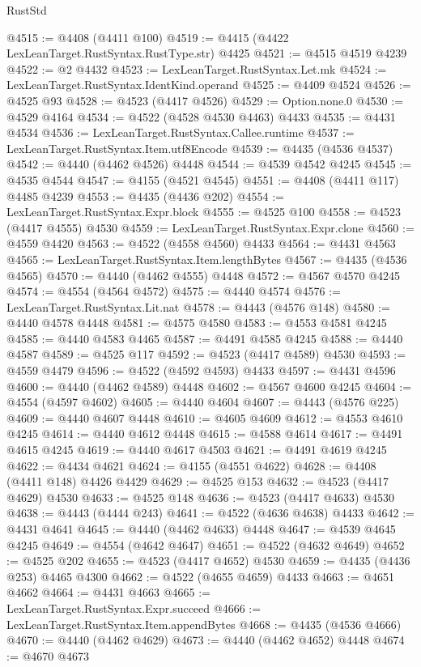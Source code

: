 \begin{lexlean}{RustStd}
\begin{coremodule}
{\begin{coremodule}
{{{{{{{{{{{{{{{{{{{{{{{{{{{{{{{{{{{{{{{{{{{{{{{{{{{{{{{{{{{{@4515 := @4408 (@4411 @100)
@4519 := @4415 (@4422 LexLeanTarget.RustSyntax.RustType.str) @4425
@4521 := @4515 @4519 @4239
@4522 := @2 @4432
@4523 := LexLeanTarget.RustSyntax.Let.mk
@4524 := LexLeanTarget.RustSyntax.IdentKind.operand
@4525 := @4409 @4524
@4526 := @4525 @93
@4528 := @4523 (@4417 @4526)
@4529 := Option.none.{0}
@4530 := @4529 @4164
@4534 := @4522 (@4528 @4530 @4463) @4433
@4535 := @4431 @4534
@4536 := LexLeanTarget.RustSyntax.Callee.runtime
@4537 := LexLeanTarget.RustSyntax.Item.utf8Encode
@4539 := @4435 (@4536 @4537)
@4542 := @4440 (@4462 @4526) @4448
@4544 := @4539 @4542 @4245
@4545 := @4535 @4544
@4547 := @4155 (@4521 @4545)
@4551 := @4408 (@4411 @117) @4485 @4239
@4553 := @4435 (@4436 @202)
@4554 := LexLeanTarget.RustSyntax.Expr.block
@4555 := @4525 @100
@4558 := @4523 (@4417 @4555) @4530
@4559 := LexLeanTarget.RustSyntax.Expr.clone
@4560 := @4559 @4420
@4563 := @4522 (@4558 @4560) @4433
@4564 := @4431 @4563
@4565 := LexLeanTarget.RustSyntax.Item.lengthBytes
@4567 := @4435 (@4536 @4565)
@4570 := @4440 (@4462 @4555) @4448
@4572 := @4567 @4570 @4245
@4574 := @4554 (@4564 @4572)
@4575 := @4440 @4574
@4576 := LexLeanTarget.RustSyntax.Lit.nat
@4578 := @4443 (@4576 @148)
@4580 := @4440 @4578 @4448
@4581 := @4575 @4580
@4583 := @4553 @4581 @4245
@4585 := @4440 @4583 @4465
@4587 := @4491 @4585 @4245
@4588 := @4440 @4587
@4589 := @4525 @117
@4592 := @4523 (@4417 @4589) @4530
@4593 := @4559 @4479
@4596 := @4522 (@4592 @4593) @4433
@4597 := @4431 @4596
@4600 := @4440 (@4462 @4589) @4448
@4602 := @4567 @4600 @4245
@4604 := @4554 (@4597 @4602)
@4605 := @4440 @4604
@4607 := @4443 (@4576 @225)
@4609 := @4440 @4607 @4448
@4610 := @4605 @4609
@4612 := @4553 @4610 @4245
@4614 := @4440 @4612 @4448
@4615 := @4588 @4614
@4617 := @4491 @4615 @4245
@4619 := @4440 @4617 @4503
@4621 := @4491 @4619 @4245
@4622 := @4434 @4621
@4624 := @4155 (@4551 @4622)
@4628 := @4408 (@4411 @148) @4426 @4429
@4629 := @4525 @153
@4632 := @4523 (@4417 @4629) @4530
@4633 := @4525 @148
@4636 := @4523 (@4417 @4633) @4530
@4638 := @4443 (@4444 @243)
@4641 := @4522 (@4636 @4638) @4433
@4642 := @4431 @4641
@4645 := @4440 (@4462 @4633) @4448
@4647 := @4539 @4645 @4245
@4649 := @4554 (@4642 @4647)
@4651 := @4522 (@4632 @4649)
@4652 := @4525 @202
@4655 := @4523 (@4417 @4652) @4530
@4659 := @4435 (@4436 @253) @4465 @4300
@4662 := @4522 (@4655 @4659) @4433
@4663 := @4651 @4662
@4664 := @4431 @4663
@4665 := LexLeanTarget.RustSyntax.Expr.succeed
@4666 := LexLeanTarget.RustSyntax.Item.appendBytes
@4668 := @4435 (@4536 @4666)
@4670 := @4440 (@4462 @4629)
@4673 := @4440 (@4462 @4652) @4448
@4674 := @4670 @4673
}}}}}}}}}}}}}}}}}}}}}}}}}}}}}}}}}}}}}}}}}}}}}}}}}}}}}}}}}}}}
\end{coremodule}}
\end{coremodule}
\end{lexlean}
